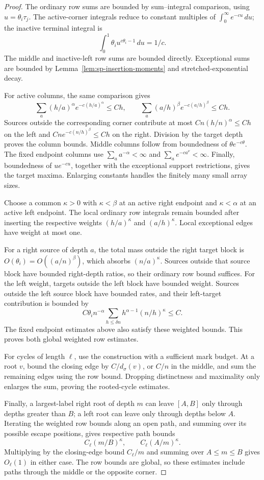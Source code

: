 \documentclass[11pt]{article}
\theoremstyle{remark}
\theoremstyle{plain}
\begin{document}
\begin{proof}
The ordinary row sums are bounded by sum--integral comparison, using
$u=\theta_i\tau_j$.  The active-corner integrals reduce to constant
multiples of $\int_0^\infty e^{-cu}\,du$; the inactive terminal integral is
\[
 \int_0^1\theta_i u^{c\theta_i-1}\,du=1/c.
\]
The middle and inactive-left row sums are bounded directly.  Exceptional
sums are bounded by Lemma~\ref{lem:sp-insertion-moments} and
stretched-exponential decay.

For active columns, the same comparison gives
\[
 \sum_a(h/a)^\alpha e^{-c(h/a)^\alpha}\le Ch,\qquad
 \sum_a(a/h)^\beta e^{-c(a/h)^\beta}\le Ch.
\]
Sources outside the corresponding corner contribute at most
$Cn(h/n)^\alpha\le Ch$ on the left and
$Cn e^{-c(n/h)^\beta}\le Ch$ on the right.  Division by the target
depth proves the column bounds.  Middle columns follow from boundedness
of $\theta e^{-c\theta}$.  The fixed endpoint columns use
$\sum_a a^{-\alpha}<\infty$ and $\sum_a e^{-ca^\nu}<\infty$.
Finally, boundedness of $ue^{-cu}$, together with the exceptional support
restrictions, gives the target maxima.  Enlarging constants handles the
finitely many small array sizes.

Choose a common $\kappa>0$ with $\kappa<\beta$ at an active right
endpoint and $\kappa<\alpha$ at an active left endpoint.  The local
ordinary row integrals remain bounded after inserting the respective
weights $(h/a)^\kappa$ and $(a/h)^\kappa$.  Local exceptional edges
have weight at most one.

For a right source of depth $a$, the total mass outside the right target
block is $O(\theta_i)=O((a/n)^\beta)$, which absorbs $(n/a)^\kappa$.
Sources outside that source block have bounded right-depth ratios, so
their ordinary row bound suffices.  For the left weight, targets outside
the left block have bounded weight.  Sources outside the left source
block have bounded rates, and their left-target contribution is bounded by
\[
 C\theta_i n^{-\alpha}
 \sum_{h\le\delta n}h^{\alpha-1}(n/h)^\kappa\le C.
\]
The fixed endpoint estimates above also satisfy these weighted bounds.
This proves both global weighted row estimates.

For cycles of length $\ell$, use the construction with a sufficient mark
budget.  At a root $v$, bound the closing edge by $C/d_\sigma(v)$,
or $C/n$ in the middle, and sum the remaining edges using the row bound.
Dropping distinctness and maximality only enlarges the sum, proving the
rooted-cycle estimates.

Finally, a largest-label right root of depth $m$ can leave $[A,B]$
only through depths greater than $B$; a left root can leave only through
depths below $A$.  Iterating the weighted row bounds along an open path,
and summing over its possible escape positions, gives respective path bounds
\[
 C_\ell(m/B)^\kappa,\qquad C_\ell(A/m)^\kappa.
\]
Multiplying by the closing-edge bound $C_\ell/m$ and summing over
$A\le m\le B$ gives $O_\ell(1)$ in either case.  The row bounds are
global, so these estimates include paths through the middle or the
opposite corner.
\end{proof}
\end{document}
